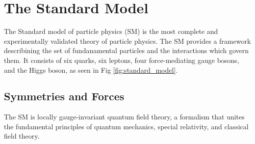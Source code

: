 \chapter{The Standard Model}
The Standard model of particle physics (SM) is the most complete and experimentally validated theory of particle physics. The SM provides a framework describining the set of fundanamental particles and the interactions which govern them. It consists of six quarks, six leptons, four force-mediating gauge bosons, and the Higgs boson, as seen in Fig \ref{fig:standard_model}. 

\section{Symmetries and Forces}
The SM is locally gauge-invariant quantum field theory, a formalism that unites the fundamental principles of quantum mechanics, special relativity, and classical field theory. 